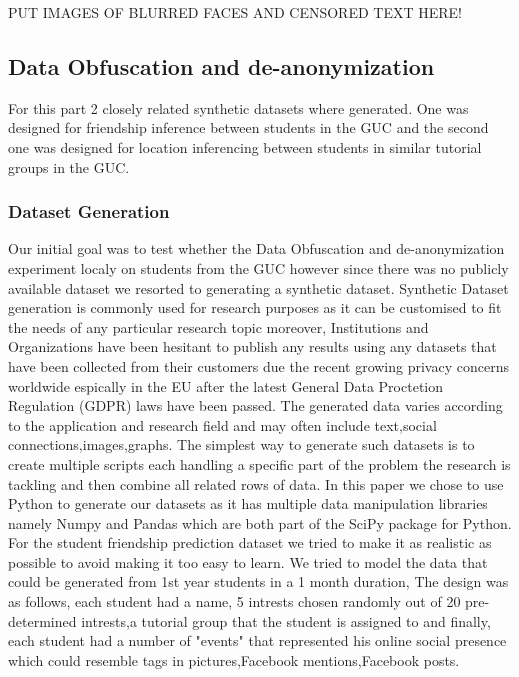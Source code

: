 \documentclass[10pt]{article}
\begin{document}
PUT IMAGES OF BLURRED FACES AND CENSORED TEXT HERE!

\subsection{Data Obfuscation and de-anonymization}
For this part 2 closely related synthetic datasets where generated. One was designed for friendship inference between students in the GUC and the second one was designed for location inferencing between
students in similar tutorial groups in the GUC.
\subsubsection{Dataset Generation}
Our initial goal was to test whether the Data Obfuscation and de-anonymization experiment localy on students from the GUC however since there was no publicly available dataset we resorted to generating
a synthetic dataset.
Synthetic Dataset generation is commonly used for research purposes as it can be customised to fit the needs of any particular research topic moreover, Institutions and Organizations
have been hesitant to publish any results using any datasets that have been collected from their customers due the recent growing privacy concerns worldwide\cite{dandekar2018comparative}  espically in the EU after 
the latest General Data Proctetion Regulation (GDPR) laws have been passed.
The generated data varies according to the application and research field and may often include text,social connections,images,graphs. The simplest way to generate such datasets is to create
multiple scripts each handling a specific part of the problem the research is tackling and then combine all related rows of data.\cite{albuquerque2011synthetic}\newline
In this paper we chose to use Python to generate our datasets as it has multiple data manipulation libraries namely Numpy and Pandas which are both part of the SciPy package for Python\cite{SciPy}.\newline
For the student friendship prediction dataset we tried to make it as realistic as possible to avoid making it too easy to learn. We tried to model the data that could be generated from 1st year students in a 1 month duration, The design was as follows, each student had a name, 5 intrests chosen randomly out of 20 pre-determined intrests,a tutorial group
that the student is assigned to and finally, each student had a number of "events" that represented his online social presence which could resemble tags in pictures,Facebook mentions,Facebook posts.
\end{document}
